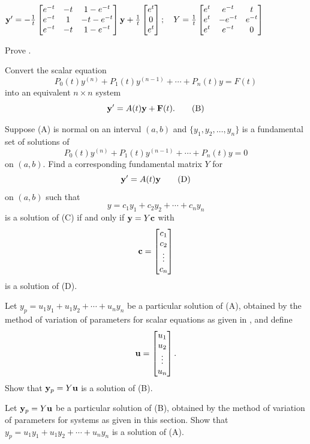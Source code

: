 \begin{exerciselist}
\item\label{exer:10.7.20}$\mathbf{y}'=-\frac{1}{t}\begin{bmatrix}
e^{-t}&-t&1-e^{-t}\\e^{-t}&1&-t-e^{-t}\\e^{-t}&-t&1-e^{-t}
\end{bmatrix}\mathbf{y}
+\frac{1}{t}\begin{bmatrix}e^t\\0 \\e^t\end{bmatrix};  \quad
Y=\frac{1}{t}\begin{bmatrix}
e^t&e^{-t}&t\\e^t&-e^{-t}&e^{-t}\\e^t&e^{-t}&0
\end{bmatrix}$

\item\label{exer:10.7.21}Prove .

\item\label{exer:10.7.22}\begin{alist}
\item %
Convert the scalar equation
\[
P_0(t)y^{(n)}+P_1(t)y^{(n-1)}+\cdots+P_n(t)y=F(t)
\tag{A}
\]
into an equivalent $n\times n$ system
\[
\mathbf{y}'=A(t)\mathbf{y}+\mathbf{F}(t).
\tag{B}
\]
\item %
Suppose  (A) is normal on an interval $(a,b)$ and
$\{y_1,y_2,\dots,y_n\}$ is a fundamental set of solutions of
\[
P_0(t)y^{(n)}+P_1(t)y^{(n-1)}+\cdots+P_n(t)y=0
\tag{C}
\]
on $(a,b)$. Find a corresponding fundamental matrix $Y$ for
\[
\mathbf{y}'=A(t)\mathbf{y}
\tag{D}
\]
on $(a,b)$ such that
\[
y=c_1y_1+c_2y_2+\cdots+c_ny_n
\]
is a solution of  (C) if and only if
$\mathbf{y}=Y\mathbf{c}$ with
\[
\mathbf{c}=\begin{bmatrix}c_1\\c_2\\\vdots\\c_n\end{bmatrix}
\]
is a solution of  (D).
\item %
Let $y_p=u_1y_1+u_1y_2+\cdots+u_ny_n$ be a particular solution of
 (A), obtained by the method of variation of parameters for scalar
equations as given in , and define
\[
\mathbf{u}=\begin{bmatrix}u_1\\u_2\\\vdots\\u_n\end{bmatrix}.
\]
Show that $\mathbf{y}_p=Y\mathbf{u}$ is a  solution of  (B).
\item %
Let  $\mathbf{y}_p=Y\mathbf{u}$ be  a particular solution of  (B),
obtained by the method of variation of parameters for systems as given in
this section. Show that
 $y_p=u_1y_1+u_1y_2+\cdots+u_ny_n$ is a solution of
 (A).
\end{alist}


\end{exerciselist}
